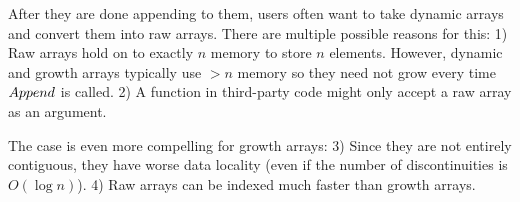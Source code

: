 After they are done appending to them, users often want to take dynamic arrays and convert them into raw arrays. There are multiple possible reasons for this: 1) Raw arrays hold on to exactly $n$ memory to store $n$ elements. However, dynamic and growth arrays typically use $> n$ memory so they need not grow every time $Append$ is called. 2) A function in third-party code might only accept a raw array as an argument.

The case is even more compelling for growth arrays: 3) Since they are not entirely contiguous, they have worse data locality (even if the number of discontinuities is $O(\log n)$). 4) Raw arrays can be indexed much faster than growth arrays.